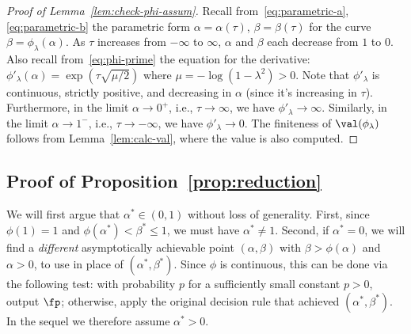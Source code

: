 \documentclass[11pt]{article}
\begin{document}
\begin{proof}[Proof of Lemma~\ref{lem:check-phi-assum}]
Recall from~\eqref{eq:parametric-a},\eqref{eq:parametric-b} the parametric form $\alpha = \alpha(\tau)$, $\beta = \beta(\tau)$ for the curve $\beta = \phi_\lambda(\alpha)$. As $\tau$ increases from $-\infty$ to $\infty$, $\alpha$ and $\beta$ each decrease from $1$ to $0$. Also recall from~\eqref{eq:phi-prime} the equation for the derivative: $\phi'_\lambda(\alpha) = \exp(\tau\sqrt{\mu/2})$ where $\mu = -\log(1-\lambda^2) > 0$. Note that $\phi'_\lambda$ is continuous, strictly positive, and decreasing in $\alpha$ (since it's increasing in $\tau$). Furthermore, in the limit $\alpha \to 0^+$, i.e., $\tau \to \infty$, we have $\phi'_\lambda \to \infty$. Similarly, in the limit $\alpha \to 1^-$, i.e., $\tau \to -\infty$, we have $\phi'_\lambda \to 0$. The finiteness of $\val(\phi_\lambda)$ follows from Lemma~\ref{lem:calc-val}, where the value is also computed.
\end{proof}

\subsection{Proof of Proposition~\ref{prop:reduction}}

We will first argue that $\alpha^* \in (0,1)$ without loss of generality. First, since $\phi(1) = 1$ and $\phi(\alpha^*) < \beta^* \le 1$, we must have $\alpha^* \ne 1$. Second, if $\alpha^* = 0$, we will find a \emph{different} asymptotically achievable point $(\alpha,\beta)$ with $\beta > \phi(\alpha)$ and $\alpha > 0$, to use in place of $(\alpha^*,\beta^*)$. Since $\phi$ is continuous, this can be done via the following test: with probability $p$ for a sufficiently small constant $p > 0$, output $\fp$; otherwise, apply the original decision rule that achieved $(\alpha^*,\beta^*)$. In the sequel we therefore assume $\alpha^* > 0$.
\end{document}
